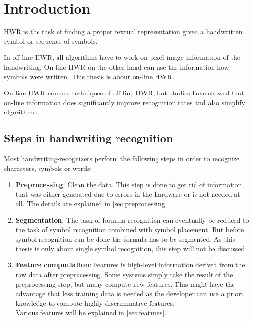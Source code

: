 \chapter{Introduction}\label{ch:Introduction}

\Gls{HWR} is the task of finding a proper textual representation
given a handwritten symbol or sequence of symbols.

In off-line \gls{HWR}, all algorithms have to work on pixel image
information of the handwriting. On-line \gls{HWR} on the other
hand can use the information how symbols were written. This thesis is about
on-line \gls{HWR}.

On-line \gls{HWR} can use techniques of off-line \gls{HWR}, but studies have
showed that on-line information does significantly improve recognition rates
and also simplify algorithms.\cite{Guyon1991}

\section{Steps in handwriting recognition}
Most handwriting-recognizers perform the following steps in order to recognize
characters, symbols or words:

\begin{enumerate}
    \item \textbf{Preprocessing}: Clean the data. This step is done to get rid
          of information that was either generated due to errors in the hardware %
          or is not needed at all. The details are explained in
          \cref{sec:preprocessing}.
    \item \textbf{Segmentation}: The task of formula recognition can eventually
          be reduced to the task of symbol recognition combined with symbol
          placement. But before symbol recognition can be done the formula has
          to be segmented. As this thesis %
          is only about single symbol recognition, this step will not be discussed.
    \item \textbf{Feature computiation}: Features is high-level information derived
          from the raw data after preprocessing. Some systems simply take the
          result of the preprocessing step, but many compute new features. This
          might have the advantage that less training data is needed as the
          developer can use a priori knowledge to compute highly discriminative
          features.\\
          Various features will be explained in \cref{sec:features}.
\end{enumerate}

